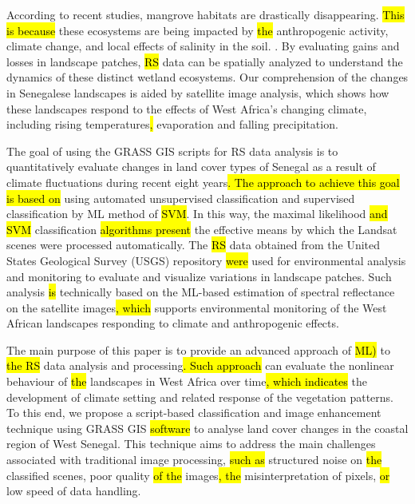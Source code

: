 \documentclass[earth,article,submit,pdftex,moreauthors]{Definitions/mdpi}
\begin{document}
{According to} recent studies, mangrove {habitats} are {drastically disappearing. \hl{This is because }these} ecosystems are\hl{ }{being impacted by} \hl{the }anthropogenic {activity}, climate change, and local effects of salinity in {the} soil. \cite{ANDRIEU2020117963,Devaney}. {By evaluating gains and losses in landscape} patches, \hl{RS} data {can be spatially analyzed} to\hl{ }understand the dynamics of these {distinct} wetland ecosystems. {Our comprehension of the changes} in Senegalese landscapes {is aided by} satellite image analysis, {which\hl{ }shows how these} landscapes {respond} to the effects of West Africa's changing climate, {including rising} temperatures\hl{, }evaporation and {falling} precipitation. 

The goal of using the GRASS GIS scripts for {RS} data analysis is to quantitatively evaluate changes in land cover types of Senegal {as a result of} climate fluctuations {during} recent eight years\hl{. The approach to achieve this goal is based on }using automated unsupervised classification and supervised classification by ML method of \hl{SVM}. In this way, the maximal likelihood \hl{and SVM }classification \hl{algorithms present} the effective means by which the\hl{ }Landsat scenes were processed automatically. The \hl{RS} data obtained from the {United States Geological Survey (}USGS) repository \hl{were} used for {environmental }analysis and{ }monitoring to {evaluate and visualize} variations in landscape patches{. Such analysis \hl{is }technically based on the ML-based estimation of spectral reflectance on the satellite images\hl{, which} supports environmental monitoring of the West African landscapes} responding to climate and anthropogenic effects{.} 

The main purpose of this paper is to provide an advanced approach of \hl{ML)} to \hl{the RS} data analysis and processing\hl{. Such approach }can {evaluate} the nonlinear behaviour of \hl{the }landscapes in West Africa over time\hl{, which indicates} the development of climate setting and{ }related response of {the} vegetation patterns. {To this end, we} propose a script-based classification and image enhancement technique {using}\hl{ }GRASS GIS\hl{ software} to {analyse} land cover changes in the coastal region of West Senegal. {This} technique {aims} to address the main {challenges associated with} traditional image processing, \hl{such as }structured noise on \hl{the }classified scenes, poor quality \hl{of the} images\hl{, the} misinterpretation of pixels, \hl{or} low speed of data handling. 
\end{document}
